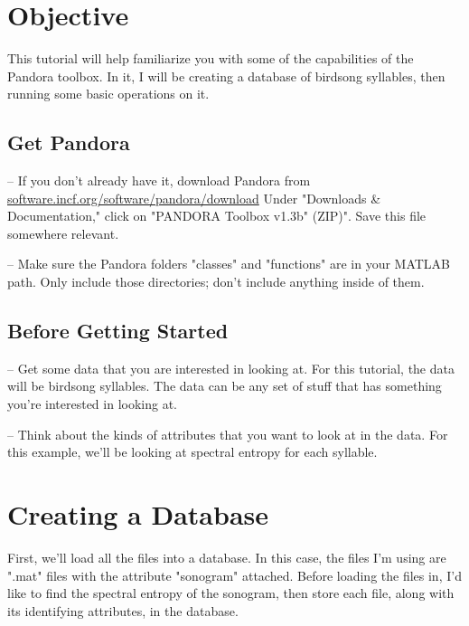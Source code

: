 \documentclass{article}
\let\oldmarginpar\marginpar
\renewcommand\marginpar[1]{\-\oldmarginpar[\raggedleft #1]%
{\raggedright #1}}
\newenvironment{checklist}{%
  \begin{list}{}{}%
  \let\olditem\item
  \renewcommand\item{\olditem -- \marginpar{$\Box$} }
  \newcommand\checkeditem{\olditem -- \marginpar{$\CheckedBox$} }
}{%
  \end{list}
}
\begin{document}

\section{Objective}

This tutorial will help familiarize you with some of the capabilities of the Pandora toolbox. In it, I will be creating a database of birdsong syllables, then running some basic operations on it.

\subsection{Get Pandora}

\begin{checklist}
	\item		If you don't already have it, download Pandora from \url{software.incf.org/software/pandora/download} Under "Downloads \& Documentation," click on "PANDORA Toolbox v1.3b" (ZIP)". Save this file somewhere relevant.
	\item		Make sure the Pandora folders "classes" and "functions" are in your MATLAB path. Only include those directories; don't include anything inside of them.
\end{checklist}

\subsection{Before Getting Started}

\begin{checklist}
	\item		Get some data that you are interested in looking at. For this tutorial, the data will be birdsong syllables. The data can be any set of stuff that has something you're interested in looking at.
	\item		Think about the kinds of attributes that you want to look at in the data. For this example, we'll be looking at spectral entropy for each syllable.
\end{checklist}

\section{Creating a Database}

First, we'll load all the files into a database. In this case, the files I'm using are ".mat" files with the attribute "sonogram" attached. Before loading the files in, I'd like to find the spectral entropy of the sonogram, then store each file, along with its identifying attributes, in the database.\\
\end{document}
